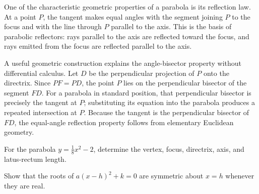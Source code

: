 One of the characteristic geometric properties of a parabola is its reflection law. At a point $P$, the tangent makes equal angles with the segment joining $P$ to the focus and with the line through $P$ parallel to the axis. This is the basis of parabolic reflectors: rays parallel to the axis are reflected toward the focus, and rays emitted from the focus are reflected parallel to the axis.

A useful geometric construction explains the angle-bisector property without differential calculus. Let $D$ be the perpendicular projection of $P$ onto the directrix. Since $PF=PD$, the point $P$ lies on the perpendicular bisector of the segment $FD$. For a parabola in standard position, that perpendicular bisector is precisely the tangent at $P$; substituting its equation into the parabola produces a repeated intersection at $P$. Because the tangent is the perpendicular bisector of $FD$, the equal-angle reflection property follows from elementary Euclidean geometry.

\begin{exercise}
For the parabola $y=\frac18x^2-2$, determine the vertex, focus, directrix, axis, and latus-rectum length.
\end{exercise}

\begin{exercise}
Show that the roots of $a(x-h)^2+k=0$ are symmetric about $x=h$ whenever they are real.
\end{exercise}

